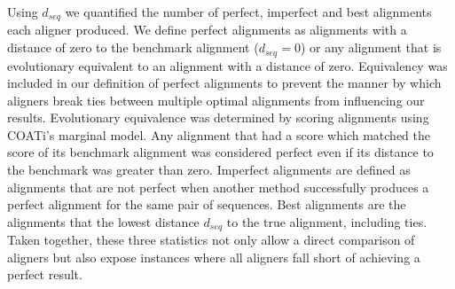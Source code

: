 \documentclass[12pt,letterpaper]{article}
\newcommand{\cyan}[1]{\textcolor{cyan}{#1}}
\begin{document}


Using $d_{seq}$ we quantified the number of perfect, imperfect and best alignments each aligner produced. We define perfect alignments as alignments with a distance of zero to the benchmark alignment ($d_{seq} = 0$) or any alignment that is evolutionary equivalent to an alignment with a distance of zero. Equivalency was included in our definition of perfect alignments to prevent the manner by which aligners break ties between multiple optimal alignments from influencing our results. Evolutionary equivalence was determined by scoring alignments using COATi's marginal model. Any alignment that had a score which matched the score of its benchmark alignment was considered perfect even if its distance to the benchmark was greater than zero.
%
Imperfect alignments are defined as alignments that are not perfect when another method successfully produces a perfect alignment for the same pair of sequences.
%
Best alignments are the alignments that the lowest distance $d_{seq}$ to the true alignment, including ties.
%
Taken together, these three statistics not only allow a direct comparison of aligners but also expose instances where all aligners fall short of achieving a perfect result.


\end{document}
